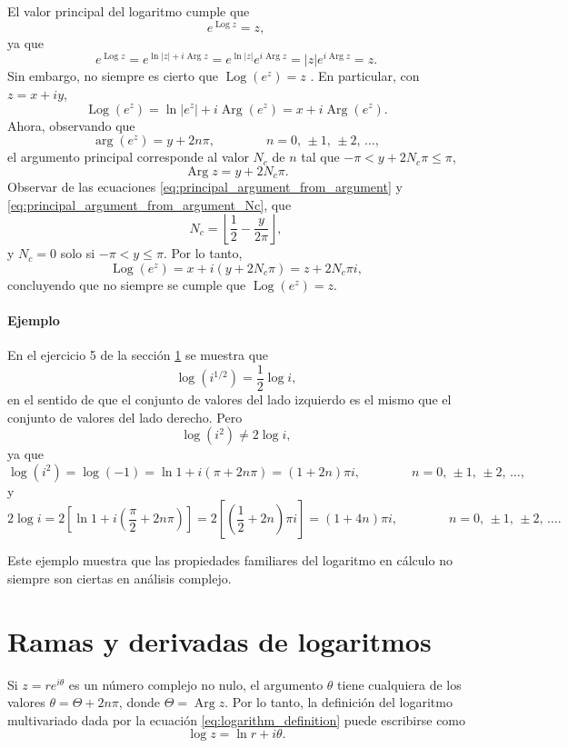 \documentclass[a4paper]{report}
\DeclareMathOperator{\Arg}{Arg}
\DeclareMathOperator{\Log}{Log}
\begin{document}
El valor principal del logaritmo cumple que
\[
 e^{\Log z}=z,
\]
ya que 
\[
 e^{\Log z}=e^{\ln|z|+i\Arg z}=e^{\ln|z|}e^{i\Arg z}=|z|e^{i\Arg z}=z.
\]
Sin embargo, no siempre es cierto que \(\Log(e^z)=z\) \cite{haber2019complex}. En particular, con \(z=x+iy\),
\[
 \Log(e^z)=\ln|e^z|+i\Arg(e^z)=x+i\Arg(e^z).
\]
Ahora, observando que 
\[
 \arg(e^z)=y+2n\pi,
 \qquad\qquad n=0,\,\pm1,\,\pm2,\,\dots, 
\]
el argumento principal corresponde al valor \(N_c\) de \(n\) tal que \(-\pi<y+2N_c\pi\leq\pi\),
\[
 \Arg z=y+2N_c\pi.
\]
Observar de las ecuaciones \ref{eq:principal_argument_from_argument} y \ref{eq:principal_argument_from_argument_Nc}, que 
\begin{equation}\label{eq:logarithm_pv_of_exponential_Nc}
 N_c=\left\lfloor\frac{1}{2}-\frac{y}{2\pi}\right\rfloor, 
\end{equation}
y \(N_c=0\) solo si \(-\pi<y\leq\pi\).
Por lo tanto,
\begin{equation}\label{eq:logarithm_pv_of_exponential}
 \Log(e^z)=x+i(y+2N_c\pi)=z+2N_c\pi i,
\end{equation}
concluyendo que no siempre se cumple que \(\Log(e^z)=z\).

\paragraph{Ejemplo} En el ejercicio 5 de la sección \ref{sec:logarithm_branches} se muestra que 
\[
 \log(i^{1/2})=\frac{1}{2}\log i,
\]
en el sentido de que el conjunto de valores del lado izquierdo es el mismo que el conjunto de valores del lado derecho. Pero
\[
 \log(i^2)\neq2\log i,
\]
ya que
\[
 \log(i^2)=\log(-1)=\ln1+i(\pi+2n\pi)=(1+2n)\pi i,\qquad\qquad n=0,\,\pm1,\,\pm2,\,\dots,
\]
y
\[
 2\log i=2\left[\ln1+i\left(\frac{\pi}{2}+2n\pi\right)\right]=2\left[\left(\frac{1}{2}+2n\right)\pi i\right]=(1+4n)\pi i,\qquad\qquad n=0,\,\pm1,\,\pm2,\,\dots.
\]

Este ejemplo muestra que las propiedades familiares del logaritmo en cálculo no siempre son ciertas en análisis complejo.

\section{Ramas y derivadas de logaritmos}\label{sec:logarithm_branches}

Si \(z=re^{i\theta}\) es un número complejo no nulo, el argumento \(\theta\) tiene cualquiera de los valores \(\theta=\Theta+2n\pi\), donde \(\Theta=\Arg z\). Por lo tanto, la definición del logaritmo multivariado dada por la ecuación \ref{eq:logarithm_definition} puede escribirse como
\begin{equation}\label{eq:logarithm_definition_theta}
 \log z=\ln r+i\theta. 
\end{equation}
\end{document}

